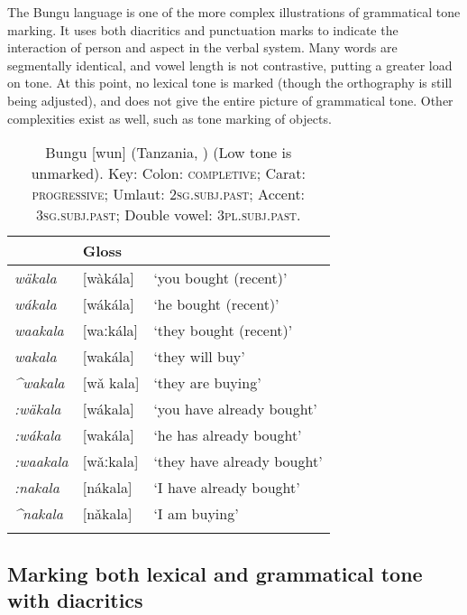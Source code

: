 \documentclass[output=paper]{langscibook}
\begin{document}
The Bungu language is one of the more complex illustrations of grammatical tone marking. It uses both diacritics and punctuation marks to indicate the interaction of person and aspect in the verbal system. Many words are segmentally identical, and vowel length is not contrastive, putting a greater load on tone. At this point, no lexical tone is marked (though the orthography is still being adjusted), and  does not give the entire picture of grammatical tone. Other complexities exist as well, such as tone marking of objects. 

\begin{table}
        \begin{tabular}{lll}
        \lsptoprule
\multicolumn{2}{l}{Orthography} & Gloss\\\midrule
        {\textit{w\"{a}kala}}  & [wàkála] & ‘you bought (recent)’            \\
        {\textit{wákala}}  & [wákála] & ‘he bought (recent)’                 \\
        {\textit{waakala}}  & [waːkála] & ‘they bought (recent)’             \\
        {\textit{wakala}}   & [wakála]   & ‘they will buy’           \\
        {\textit{\^{}wakala}}  & [wa\v{} kala]   & ‘they are buying’ \\
        {\textit{:w\"{a}kala}} & [wákala] & {‘you have already bought’}\\
        {\textit{:wákala}}  & [wakála]  & {‘he has already bought’}\\
        {\textit{:waakala}}  & [wǎːkala] & {‘they have already bought’}\\
        {\textit{:nakala}}  & [nákala] & {‘I have already bought’}\\
        {\textit{\^{}nakala} } & [nǎkala]  & {‘I am buying’}\\
\lspbottomrule
        \end{tabular}
        \caption{Bungu [wun] (Tanzania, \citealt{Katterhenrich2016}) \textmd{(Low tone is unmarked)}. Key:  Colon: \textsc{completive}; Carat: \textsc{progressive}; Umlaut: \textsc{2sg.subj.past}; Accent: \textsc{3sg.subj.past}; Double vowel: \textsc{3pl.subj.past}.}
        \label{tab:BunguGrammaticalToneMarking}
    \end{table}

\subsection{Marking both lexical and grammatical tone with diacritics}
\label{sec:HowToneMarked:LexicalGrammatical:4}
\end{document}

